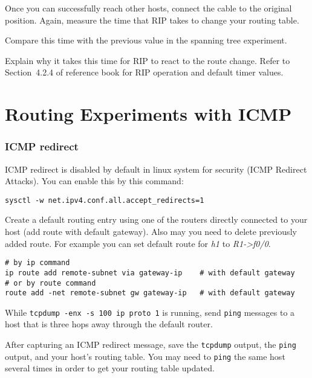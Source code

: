 \documentclass{../UTNetLab}
\begin{document}
    Once you can successfully reach other hosts, connect the cable to the original position.
    Again, measure the time that RIP takes to change your routing table.
    
    \begin{report}
        \item Compare this time with the previous value in the spanning tree experiment.

        \item Explain why it takes this time for RIP to react to the route change.
            Refer to Section~4.2.4 of reference book for RIP operation and default timer values.
    \end{report}


\part{Routing Experiments with ICMP}
\section{ICMP redirect}
    ICMP redirect is disabled by default in linux system for security (ICMP Redirect Attacks).
    You can enable this by this command:
    \begin{lstlisting}
sysctl -w net.ipv4.conf.all.accept_redirects=1
    \end{lstlisting}

    Create a default routing entry using one of the routers directly connected to your host (add route with default gateway).
    Also may you need to delete previously added route.
    For example you can set default route for \textit{h1} to \textit{R1->f0/0}.

    \begin{lstlisting}[emph={eth0,gateway-ip,remote-subnet}]
# by ip command
ip route add remote-subnet via gateway-ip    # with default gateway
# or by route command
route add -net remote-subnet gw gateway-ip   # with default gateway
    \end{lstlisting}

    While \lstinline{tcpdump -enx -s 100 ip proto 1} is running, send \lstinline{ping} messages to a host that is three hops away through the default router.

    After capturing an ICMP redirect message, save the \lstinline{tcpdump} output, the \lstinline{ping} output, and your host’s routing table.
    You may need to \lstinline{ping} the same host several times in order to get your routing table updated.
    
\end{document}
